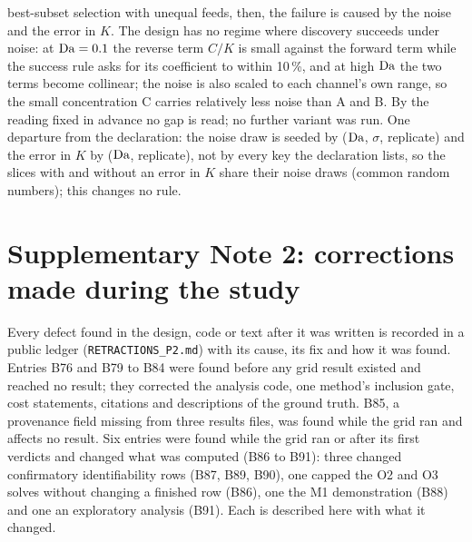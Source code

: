 best-subset selection with unequal feeds, then, the failure is caused by the noise and the error in
$K$. The design has no regime where discovery succeeds under noise: at $\mathrm{Da} = 0.1$ the reverse term
$C/K$ is small against the forward term while the success rule asks for its coefficient to within
10\,\%, and at high $\mathrm{Da}$ the two terms become collinear; the noise is also scaled to each channel's own
range, so the small concentration C carries relatively less noise than A and B. By the reading fixed in
advance no gap is read; no further variant was run. One departure from the declaration: the noise draw
is seeded by ($\mathrm{Da}$, $\sigma$, replicate) and the error in $K$ by ($\mathrm{Da}$, replicate), not by every key the
declaration lists, so the slices with and without an error in $K$ share their noise draws (common
random numbers); this changes no rule.


\section*{Supplementary Note 2: corrections made during the study}
Every defect found in the design, code or text after it was written is recorded in a public
ledger (\texttt{RETRACTIONS\_P2.md}) with its cause, its fix and how it was found. Entries
B76 and B79 to B84 were found before any grid result existed and reached no result; they
corrected the analysis code, one method's inclusion gate, cost statements, citations and
descriptions of the ground truth. B85, a provenance field missing from three results files, was
found while the grid ran and affects no result. Six entries were found while the grid ran or
after its first verdicts and changed what was computed (B86 to B91): three changed confirmatory
identifiability rows (B87, B89, B90), one capped the O2 and O3 solves without changing a finished
row (B86), one the M1 demonstration (B88) and one an exploratory analysis (B91). Each is described
here with what it changed.

